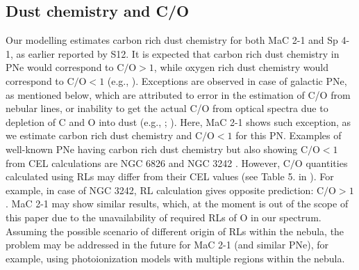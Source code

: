 \documentclass[a4paper,fleqn,usenatbib]{mnras}
\begin{document}
\subsection{Dust chemistry and C/O} \label{sec:dustchemistry}
Our modelling estimates carbon rich dust chemistry for both MaC 2-1 and Sp 4-1, as earlier reported by S12. It is expected that carbon rich dust chemistry in PNe would correspond to $\mathrm{C/O}>1$, while oxygen rich dust chemistry would correspond to $\mathrm{C/O}<1$ (e.g., \citealt{2007ApJ...671.1669S}). Exceptions are observed in case of galactic PNe, as mentioned below, which are attributed to error in the estimation of C/O from nebular lines, or inability to get the actual C/O from optical spectra due to depletion of C and O into dust (e.g., \citealt{2014ApJ...784..173D}; \citealt{2015MNRAS.449.1797D}). Here, MaC 2-1 shows such exception, as we estimate carbon rich dust chemistry and $\mathrm{C/O}<1$ for this PN. Examples of well-known PNe having carbon rich dust chemistry but also showing $\mathrm{C/O}<1$ from CEL calculations are NGC 6826 and NGC 3242 \citep{2014ApJ...784..173D,2017MNRAS.471.4648V}. However, $\mathrm{C/O}$ quantities calculated using RLs may differ from their CEL values (see Table 5. in \citealt{2014ApJ...784..173D}). For example, in case of NGC 3242, RL calculation gives opposite prediction: $\mathrm{C/O}>1$. MaC 2-1 may show similar results, which, at the moment is out of the scope of this paper due to the unavailability of required RLs of O in our spectrum. Assuming the possible scenario of different origin of RLs within the nebula, the problem may be addressed in the future for MaC 2-1 (and similar PNe), for example, using photoionization models with multiple regions within the nebula.
\end{document}
